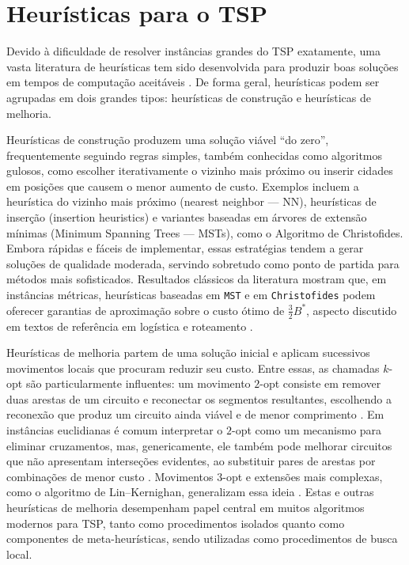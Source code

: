\section{Heurísticas para o TSP}\label{sec-22-heuristicas-tsp}

Devido à dificuldade de resolver instâncias grandes do TSP exatamente,
uma vasta literatura de heurísticas tem sido desenvolvida para produzir
boas soluções em tempos de computação aceitáveis
\autocite{cook2012pursuit}. De forma geral, heurísticas podem ser
agrupadas em dois grandes tipos: heurísticas de construção e heurísticas
de melhoria.

Heurísticas de construção produzem uma solução viável ``do zero'',
frequentemente seguindo regras simples, também conhecidas como
algoritmos gulosos, como escolher iterativamente o vizinho mais próximo
ou inserir cidades em posições que causem o menor aumento de custo.
Exemplos incluem a heurística do vizinho mais próximo (nearest neighbor
--- NN), heurísticas de inserção (insertion heuristics) e variantes
baseadas em árvores de extensão mínimas (Minimum Spanning Trees ---
MSTs), como o Algoritmo de Christofides. Embora rápidas e fáceis de
implementar, essas estratégias tendem a gerar soluções de qualidade
moderada, servindo sobretudo como ponto de partida para métodos mais
sofisticados. Resultados clássicos da literatura mostram que, em
instâncias métricas, heurísticas baseadas em \texttt{MST} e em
\texttt{Christofides} podem oferecer garantias de aproximação sobre o
custo ótimo de \(\frac{3}{2}B^*\), aspecto discutido em textos de
referência em logística e roteamento \autocite{simchi2005logic}.

Heurísticas de melhoria partem de uma solução inicial e aplicam
sucessivos movimentos locais que procuram reduzir seu custo. Entre
essas, as chamadas \(k\)-opt são particularmente influentes: um
movimento \(2\)-opt consiste em remover duas arestas de um circuito e
reconectar os segmentos resultantes, escolhendo a reconexão que produz
um circuito ainda viável e de menor comprimento
\autocite{croes1958method}. Em instâncias euclidianas é comum
interpretar o \(2\)-opt como um mecanismo para eliminar cruzamentos,
mas, genericamente, ele também pode melhorar circuitos que não
apresentam interseções evidentes, ao substituir pares de arestas por
combinações de menor custo \autocite{croes1958method}. Movimentos
\(3\)-opt e extensões mais complexas, como o algoritmo de
Lin--Kernighan, generalizam essa ideia \autocite{lin1973efficient}.
Estas e outras heurísticas de melhoria desempenham papel central em
muitos algoritmos modernos para TSP, tanto como procedimentos isolados
quanto como componentes de meta-heurísticas, sendo utilizadas como
procedimentos de busca local.

